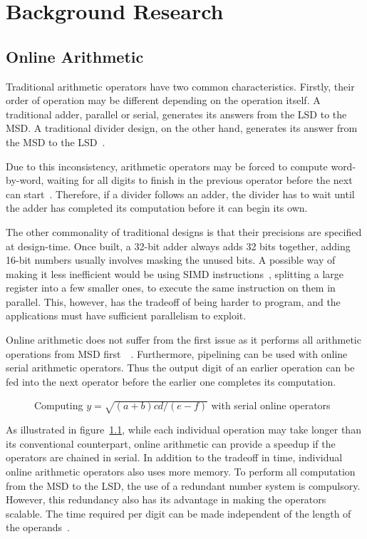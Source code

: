 \chapter{Background Research}

\section{Online Arithmetic}
Traditional arithmetic operators have two common characteristics.
Firstly, their order of operation may be different depending on the operation itself.
A traditional adder, parallel or serial, generates its answers from the LSD to the MSD.
A traditional divider design, on the other hand, generates its answer from the MSD to the LSD~\cite{Brent1}\cite{Srinivas1}.

Due to this inconsistency, arithmetic operators may be forced to compute word-by-word, waiting for all digits to finish in the previous operator before the next can start~\cite{Zhao1}.
Therefore, if a divider follows an adder, the divider has to wait until the adder has completed its computation before it can begin its own.

The other commonality of traditional designs is that their precisions are specified at design-time.
Once built, a 32-bit adder always adds 32 bits together, adding 16-bit numbers usually involves masking the unused bits.
A possible way of making it less inefficient would be using SIMD instructions~\cite{Duncan1}, splitting a large register into a few smaller ones, to execute the same instruction on them in parallel.
This, however, has the tradeoff of being harder to program, and the applications must have sufficient parallelism to exploit.

Online arithmetic does not suffer from the first issue as it performs all arithmetic operations from MSD first~\cite{Ercegovac1}~\cite{Ercegovac2}.
Furthermore, pipelining can be used with online serial arithmetic operators.
Thus the output digit of an earlier operation can be fed into the next operator before the earlier one completes its computation.

\begin{figure}[H]
  \centering
  
  \caption{Computing $y=\sqrt{(a+b)cd/(e-f)}$ with serial online operators~\cite{Ercegovac1}}
  \label{Online}
\end{figure}

As illustrated in figure~\ref{Online}, while each individual operation may take longer than its conventional counterpart, online arithmetic can provide a speedup if the operators are chained in serial.
In addition to the tradeoff in time, individual online arithmetic operators also uses more memory.
To perform all computation from the MSD to the LSD, the use of a redundant number system is compulsory.
However, this redundancy also has its advantage in making the operators scalable.
The time required per digit can be made independent of the length of the operands~\cite{Trivedi1}.

